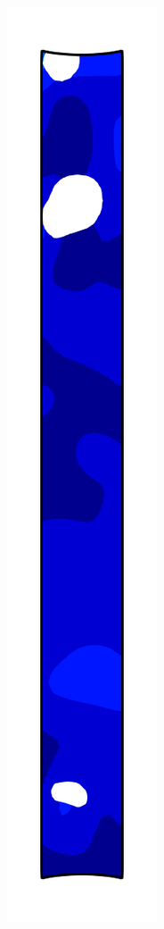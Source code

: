 \begin{figure}[!htb]
\begin{subfigure}{0.08\textwidth}
  \end{subfigure}
  \begin{subfigure}{0.08\textwidth}
    \centering
    \includegraphics[width=\textwidth]{Chapter5/figures/spallation/psie_2}

\end{subfigure}
\end{figure}
